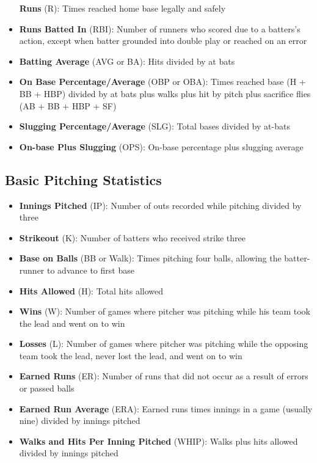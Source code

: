 \documentclass[
  11pt,
]{book}
\theoremstyle{definition}
\theoremstyle{definition}
\theoremstyle{definition}
\theoremstyle{definition}
\theoremstyle{remark}
\begin{document}
\begin{itemize}
  \textbf{Runs} (R): Times reached home base legally and safely
\item
  \textbf{Runs Batted In} (RBI): Number of runners who scored due to a batters's action, except when batter grounded into double play or reached on an error
\item
  \textbf{Batting Average} (AVG or BA): Hits divided by at bats
\item
  \textbf{On Base Percentage/Average} (OBP or OBA): Times reached base (H + BB + HBP) divided by at bats plus walks plus hit by pitch plus sacrifice flies (AB + BB + HBP + SF)
\item
  \textbf{Slugging Percentage/Average} (SLG): Total bases divided by at-bats
\item
  \textbf{On-base Plus Slugging} (OPS): On-base percentage plus slugging average
\end{itemize}

\newpage

\hypertarget{basic-pitching-statistics}{%
\subsection{Basic Pitching Statistics}\label{basic-pitching-statistics}}

\begin{itemize}
\item
  \textbf{Innings Pitched} (IP): Number of outs recorded while pitching divided by three
\item
  \textbf{Strikeout} (K): Number of batters who received strike three
\item
  \textbf{Base on Balls} (BB or Walk): Times pitching four balls, allowing the batter-runner to advance to first base
\item
  \textbf{Hits Allowed} (H): Total hits allowed
\item
  \textbf{Wins} (W): Number of games where pitcher was pitching while his team took the lead and went on to win
\item
  \textbf{Losses} (L): Number of games where pitcher was pitching while the opposing team took the lead, never lost the lead, and went on to win
\item
  \textbf{Earned Runs} (ER): Number of runs that did not occur as a result of errors or passed balls
\item
  \textbf{Earned Run Average} (ERA): Earned runs times innings in a game (usually nine) divided by innings pitched
\item
  \textbf{Walks and Hits Per Inning Pitched} (WHIP): Walks plus hits allowed divided by innings pitched
\end{itemize}
\end{document}
